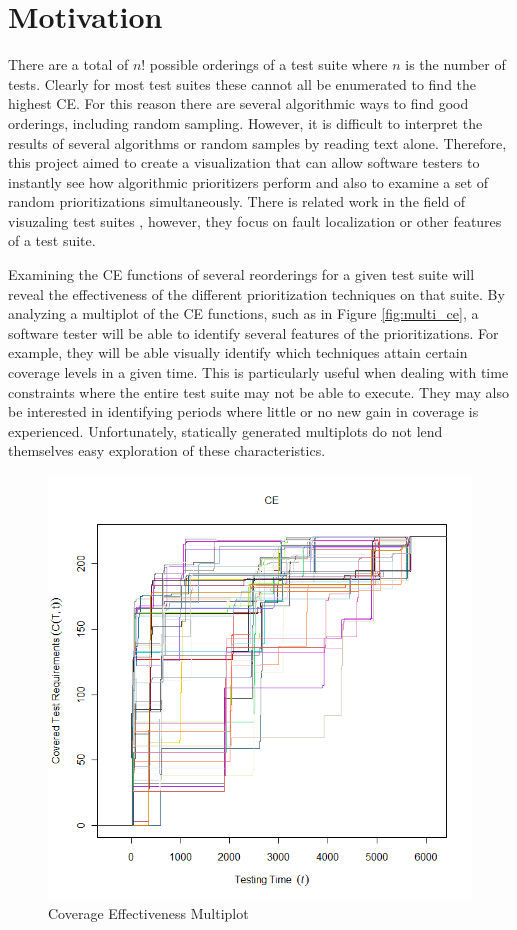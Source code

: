 \documentclass{vgtc}                          %
\begin{document}
\section{Motivation}

There are a total of $n$! possible orderings of a test suite where $n$ is the number of tests.  Clearly for most test suites these cannot all be enumerated to find the highest CE.  For this reason there are several algorithmic ways to find good orderings, including random sampling.  However, it is difficult to interpret the results of several algorithms or random samples by reading text alone.  Therefore, this project aimed to create a visualization that can allow software testers to instantly see how algorithmic prioritizers perform and also to examine a set of random prioritizations simultaneously.  There is related work in the field of visuzaling test suites \cite{tarantula} \cite{bart}, however, they focus on fault localization or other features of a test suite.

Examining the CE functions of several reorderings for a given test suite will reveal the effectiveness of the different prioritization techniques on that suite.  By analyzing a multiplot of the CE functions, such as in Figure \ref{fig:multi_ce}, a software tester will be able to identify several features of the prioritizations.  For example, they will be able visually identify which techniques attain certain coverage levels in a given time.  This is particularly useful when dealing with time constraints where the entire test suite may not be able to execute.  They may also be interested in identifying periods where little or no new gain in coverage is experienced.  Unfortunately, statically generated multiplots do not lend themselves easy exploration of these characteristics.  

\begin{figure}[t]
\centering
\includegraphics[scale=.25]{original}
\caption{Coverage Effectiveness Multiplot}
\end{figure}
\label{fig:multi_ce}
\end{document}
